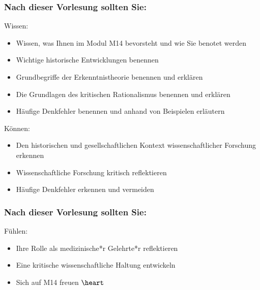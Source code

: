 \documentclass{beamer}
\begin{document}
\begin{frame}

\frametitle{Nach dieser Vorlesung sollten Sie:}



\begin{block}{Wissen:}
\begin{itemize}
\item
Wissen, was Ihnen im Modul M14 bevorsteht und wie Sie benotet werden

\item
Wichtige historische Entwicklungen benennen
\item 
Grundbegriffe der Erkenntnistheorie benennen und erklären
\item 
Die Grundlagen des kritischen Rationalismus benennen und erklären
\item 
Häufige Denkfehler benennen und anhand von Beispielen erläutern
\end{itemize}

\end{block}

 

\begin{block}{Können:}
\begin{itemize}
\item
Den historischen und gesellschaftlichen Kontext wissenschaftlicher Forschung erkennen
\item 
Wissenschaftliche Forschung kritisch reflektieren
\item 
Häufige Denkfehler erkennen und vermeiden
\end{itemize}
\end{block}

\end{frame}


\begin{frame}

\frametitle{Nach dieser Vorlesung sollten Sie:}

\begin{block}{Fühlen:}

\begin{itemize}
\item
Ihre Rolle als medizinische*r Gelehrte*r reflektieren
\item 
Eine kritische wissenschaftliche Haltung entwickeln
\item 
Sich auf M14 freuen $\heart$
\end{itemize}

\end{block}


\end{frame}
\end{document}
